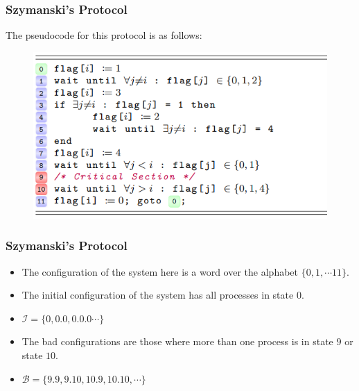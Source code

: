 \documentclass{beamer}
\begin{document}
{        \begin{frame}[fragile]
            \frametitle{Szymanski's Protocol}
            The pseudocode for this protocol is as follows:
            \begin{figure}
                \begin{center}
                    \includegraphics[scale=1]{images/codeimg.png}
                \end{center}
            \end{figure}
        \end{frame}

        \begin{frame}
            \frametitle{Szymanski's Protocol}
            \begin{itemize}
                \item The configuration of the system here is a word over the alphabet $\{0, 1, \cdots 11\}$.
                \item The initial configuration of the system has all processes in state $0$.
                \item $\mathcal{I} = \{0, 0.0, 0.0.0 \cdots\}$
                \item The bad configurations are those where more than one process is in state $9$ or state $10$.
                \item $\mathcal{B} = \{9.9, 9.10, 10.9, 10.10, \cdots\}$
            \end{itemize}
        \end{frame}
    }
\end{document}
